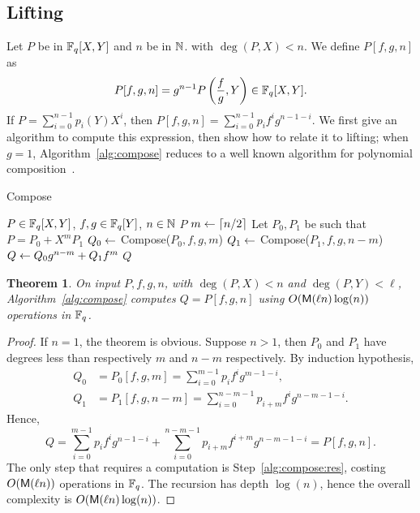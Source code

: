 \documentclass{sig-alternate}
\newtheorem{theorem}[definition]{Theorem}
\begin{document}
\subsection{Lifting}

Let $P$ be in $\mathbb{F}_q[X,Y]$ and $n$ be in $\mathbb{N}$. with $\deg(P,X)< n$. We
define $P[f,g,n]$ as
$$P[f,g,n] = g^{n-1} P\left (\frac fg, Y\right) \in \mathbb{F}_q[X,Y].$$ If
$P=\sum_{i=0}^{n-1} p_i(Y) X^i$, then $P[f,g,n] = \sum_{i=0}^{n-1}
p_if^ig^{n-1-i}$.  We first give an algorithm to compute this
expression, then show how to relate it to lifting; when $g=1$,
Algorithm~\ref{alg:compose} reduces to a well known algorithm for
polynomial composition~\cite[Ex.~9.20]{vzGG}.

\begin{algorithm}[t]
  \caption{Compose}
  \label{alg:compose}
  \begin{algorithmic}[1]
    \REQUIRE $P\in \mathbb{F}_q[X,Y]$, $f,g\in \mathbb{F}_q[Y]$, $n\in\mathbb{N}$
    \RETURN $P$
    \ELSE
    \STATE $m \leftarrow \lceil n/2\rceil$
    \STATE Let $P_0,P_1$ be such that $P = P_0 + X^mP_1$
    \STATE $Q_0 \leftarrow$ Compose($P_0, f, g, m$)
    \STATE $Q_1 \leftarrow$ Compose($P_1, f, g, n-m$)
    \STATE $Q \leftarrow Q_0g^{n-m} + Q_1f^m$  \label{alg:compose:res}
    \RETURN $Q$
    \ENDIF
  \end{algorithmic}
\end{algorithm}

\begin{theorem}
  \label{th:compose}
  On input $P,f,g,n$, with $\deg(P,X)<n$ and $\deg(P,Y) < \ell$,
  Algorithm~\ref{alg:compose} computes $Q=P[f,g,n]$ using $O(\mathsf{M}(\ell
  n)\log(n))$ operations in $\mathbb{F}_q$.
\end{theorem}
\begin{proof}
  If $n=1$, the theorem is obvious. Suppose $n>1$, then $P_0$ and
  $P_1$ have degrees less than respectively $m$ and $n-m$
  respectively. By induction hypothesis,
  \begin{equation*}
    \begin{aligned}
      Q_0 &= P_0[f,g,m] = \sum_{i=0}^{m-1}p_if^ig^{m-1-i},\\
      Q_1 &= P_1[f,g,n-m] = \sum_{i=0}^{n-m-1}p_{i+m}f^ig^{n-m-1-i}.   
    \end{aligned}
  \end{equation*}
  Hence,
  \begin{equation*}
    Q = \sum_{i=0}^{m-1}p_if^ig^{n-1-i} +
    \sum_{i=0}^{n-m-1}p_{i+m}f^{i+m}g^{n-m-1-i} =
    P[f,g,n].
  \end{equation*}
  The only step that requires a computation is
  Step~\ref{alg:compose:res}, costing $O(\mathsf{M}(\ell n))$ operations in
  $\mathbb{F}_q$. The recursion has depth $\log(n)$, hence the overall
  complexity is $O(\mathsf{M}(\ell n)\log(n))$.
\end{proof}
\end{document}
